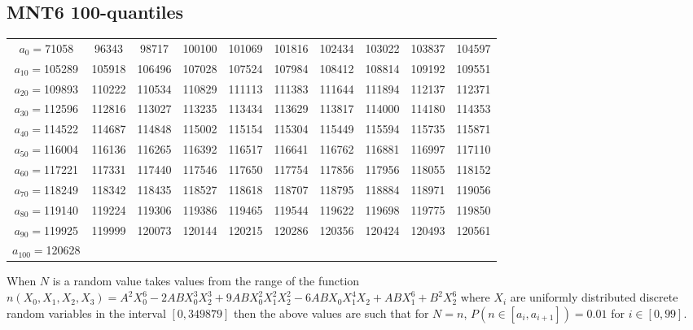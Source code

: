 \documentclass[a4paper, 10pt, envcountsect, runningheads]{article}
\numberwithin{figure}{section}
\numberwithin{equation}{section}
\begin{document}
\subsection{MNT6 100-quantiles}\label{A:MNT100quantiles}
{\tiny{
\begin{tabular}{cccccccccc}
$a_0=$71058 &96343& 98717&100100&101069&101816&102434&103022&103837&104597\\
$a_{10}=$105289&105918&106496&107028&107524&107984&108412&108814&109192&109551\\
$a_{20}=$109893&110222&110534&110829&111113&111383&111644&111894&112137&112371\\
$a_{30}=$112596&112816&113027&113235&113434&113629&113817&114000&114180&114353\\
$a_{40}=$114522&114687&114848&115002&115154&115304&115449&115594&115735&115871\\
$a_{50}=$116004&116136&116265&116392&116517&116641&116762&116881&116997&117110\\
$a_{60}=$117221&117331&117440&117546&117650&117754&117856&117956&118055&118152\\
$a_{70}=$118249&118342&118435&118527&118618&118707&118795&118884&118971&119056\\
$a_{80}=$119140&119224&119306&119386&119465&119544&119622&119698&119775&119850\\
$a_{90}=$119925&119999& 120073& 120144& 120215& 120286&120356&120424&120493&120561\\
$a_{100}=$120628&&&&&&&&&\\
\end{tabular}
}}
When $N$ is a random value takes values from the range of the function $n(X_0,X_1,X_2,X_3)=A^2 X_0^6 - 2 A B X_0^3 X_2^3 + 9 A B X_0^2 X_1^2 X_2^2 - 6 A B X_0 X_1^4 X_2 + ABX_1^6 + B^2 X_2^6$ where $X_i$ are uniformly distributed discrete random variables in the interval $[0,349879]$ then the above values are such that for $N=n$, $P(n\in[a_i,a_{i+1}])=0.01$ for $i\in[0,99]$.
\end{document}
